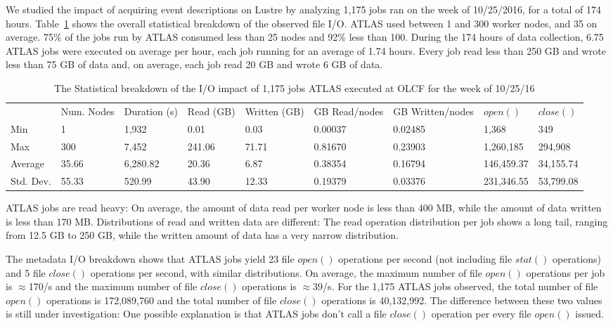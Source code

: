 We studied the impact of acquiring event descriptions on Lustre by analyzing
1,175 jobs ran on the week of 10/25/2016, for a total of 174 hours.
Table~\ref{panda-olcf-stats} shows the overall statistical breakdown of the
observed file I/O. ATLAS used between 1 and 300 worker nodes, and 35 on
average. 75\% of the jobs run by ATLAS consumed less than 25 nodes and 92\%
less than 100. During the 174 hours of data collection, 6.75 ATLAS jobs were
executed on average per hour, each job running for an average of 1.74 hours.
Every job read less than 250 GB and wrote less than 75 GB of data and, on
average, each job read 20 GB and wrote 6 GB of data.

\begin{table}[t]
\centering
\begin{tabular}{lllllllll} & Num. Nodes & Duration (s) & Read (GB) & Written
 (GB) & GB Read/nodes & GB Written/nodes & $open()$ & $close()$ \\ Min & 1 &
 1,932 & 0.01 & 0.03 & 0.00037 & 0.02485 & 1,368 & 349 \\ Max & 300 & 7,452 &
 241.06 & 71.71 & 0.81670 & 0.23903 & 1,260,185 & 294,908 \\ Average & 35.66
 & 6,280.82 & 20.36 & 6.87 & 0.38354 & 0.16794 & 146,459.37 & 34,155.74 \\
 Std. Dev. & 55.33 & 520.99 & 43.90 & 12.33 & 0.19379 & 0.03376 & 231,346.55
 & 53,799.08
\end{tabular}
\caption{The Statistical breakdown of the I/O impact of 1,175 jobs ATLAS
executed at OLCF for the week of 10/25/16}
\label{panda-olcf-stats}
\end{table}

ATLAS jobs are read heavy: On average, the amount of data read per worker
node is less than 400 MB, while the amount of data written is less than 170
MB\@. Distributions of read and written data are different: The read
operation distribution per job shows a long tail, ranging from 12.5 GB to 250
GB, while the written amount of data has a very narrow distribution.

The metadata I/O breakdown shows that ATLAS jobs yield 23 file $open()$
operations per second (not including file $stat()$ operations) and 5 file
$close()$ operations per second, with similar distributions. On average, the
maximum number of file $open()$ operations per job is $\approx$170/s and the
maximum number of file $close()$ operations is $\approx$39/s. For the 1,175
ATLAS jobs observed, the total number of file $open()$ operations is
172,089,760 and the total number of file $close()$ operations is 40,132,992.
The difference between these two values is still under investigation: One
possible explanation is that ATLAS jobs don't call a file $close()$ operation
per every file $open()$ issued.

